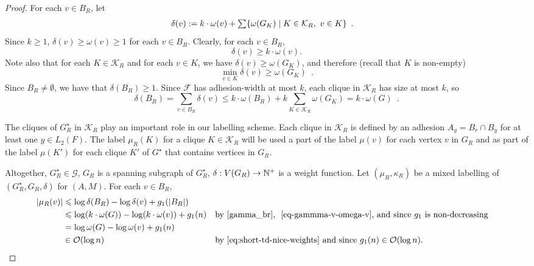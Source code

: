 \documentclass{patmorin}
\let\eqref\cref
\renewcommand{\ge}{\geqslant}
\renewcommand{\le}{\leqslant}
\renewcommand{\geq}{\geqslant}
\newcommand{\Oh}{\mathcal{O}}
\DeclarePairedDelimiter{\set}{\{}{\}}
\begin{document}
\begin{proof}
    For each $v\in B_R$, let
    \begin{align*}
\delta(v)&:=k\cdot\omega(v)+\textstyle\sum\set{\omega(G_K)\mid K\in\mathcal{K}_R,\ v\in K} \enspace .
    \end{align*}
    Since $k\geq1$, $\delta(v)\geq\omega(v)\geq 1$ for each $v\in B_R$.
    Clearly, for each $v\in B_R$, 
    \begin{equation}
    \label{eq-gammma-v-omega-v}
    \delta(v) \geq k\cdot\omega(v).
    \end{equation}
    Note also that for each $K\in\mathcal{K}_R$ and for each $v\in K$, we have $\delta(v)\ge \omega(G_K)$, and therefore (recall that $K$ is non-empty)
    \begin{equation}
       \min_{v\in K}\delta(v) \ge \omega(G_K) \enspace . \label{gamma_v_lower_bound}
    \end{equation}
    Since $B_R\neq\emptyset$, we have that $\delta(B_R)\geq1$.
    Since $\mathcal{F}$ has adhesion-width at most $k$, each clique in $\mathcal{K}_R$ has size at most $k$, so
    \begin{equation}
       \delta(B_R)=\sum_{v\in B_R}\delta(v)
       \le k\cdot\omega(B_R) + k\sum_{K\in\mathcal{K}_R}\omega(G_K)
       = k\cdot\omega(G)  \enspace . \label{gamma_br}
    \end{equation}

    The cliques of $G^\star_R$ in $\mathcal{K}_R$ play an important role in our labelling scheme.
    Each clique in $\mathcal{K}_R$ is defined by an adhesion $A_y=B_r\cap B_y$ for at least one $y\in L_2(F)$.  The label $\mu_R(K)$ for a clique $K\in\mathcal{K}_R$ will be used a part of the label $\mu(v)$ for each vertex $v$ in $G_R$ and as part of the label $\mu(K')$ for each clique $K'$ of $G^\star$ that contains vertices in $G_R$.

    Altogether, $G^\star_R\in\mathcal{G}$, $G_R$ is a spanning subgraph of $G^\star_R$, $\delta:V(G_R)\to\mathbb{N}^+$ is a weight function. Let $(\mu_R,\kappa_R)$ be a mixed labelling of $(G^\star_R, G_R, \delta)$ for $(A, M)$. For each $v\in B_R$, 
    \begin{align}
       |\mu_R(v)|&\le \log \delta(B_R)-\log\delta(v)+g_1(|B_R|)\notag\\
       &\le \log (k\cdot\omega(G)) - \log (k\cdot\omega(v)) + g_1(n)&&\textrm{by~\eqref{gamma_br}, ~\eqref{eq-gammma-v-omega-v}, and since $g_1$ is non-decreasing}\notag\\
       &= \log\omega(G) - \log\omega(v) + g_1(n)\label{eq:mu-R-bounded-in-omega}\\
       &\in\Oh(\log n)&&\textrm{by~\eqref{eq:short-td-nice-weights} and since $g_1(n)\in\Oh(\log n)$.}
       \label{eq:mu-R-in-logn}
    \end{align}


\end{proof}
\end{document}
